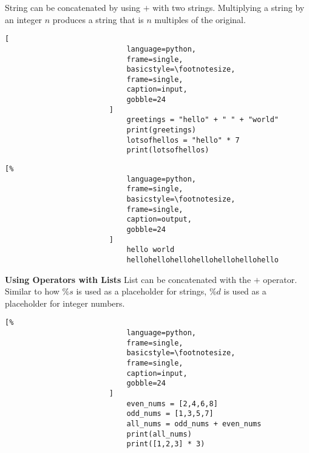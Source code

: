 \documentclass[crop=false,class=book,oneside]{standalone}
\begin{document}
                    String can be concatenated by using $+$ with two
                    strings. Multiplying a string by an integer $n$
                    produces a string that is $n$ multiples of the
                    original.\newline
                    \begin{minipage}[t]{.48\textwidth}
                        \centering
                        \begin{lstlisting}[
                            language=python,
                            frame=single,
                            basicstyle=\footnotesize,
                            frame=single,
                            caption=input,
                            gobble=24
                        ]
                            greetings = "hello" + " " + "world"
                            print(greetings)
                            lotsofhellos = "hello" * 7
                            print(lotsofhellos)
                        \end{lstlisting}
                    \end{minipage}\hfill
                    \begin{minipage}[t]{.48\textwidth}
                        \centering
                        \begin{lstlisting}[%
                            language=python,
                            frame=single,
                            basicstyle=\footnotesize,
                            frame=single,
                            caption=output,
                            gobble=24
                        ]
                            hello world
                            hellohellohellohellohellohellohello
                        \end{lstlisting}
                    \end{minipage}
                \textbf{Using Operators with Lists}
                    List can be concatenated with the $+$ operator.
                    Similar to how $\%s$ is used as a placeholder for
                    strings, $\%d$ is used as a placeholder for integer
                    numbers.\newline
                    \begin{minipage}[t]{.48\textwidth}
                        \centering
                        \begin{lstlisting}[%
                            language=python,
                            frame=single,
                            basicstyle=\footnotesize,
                            frame=single,
                            caption=input,
                            gobble=24
                        ]
                            even_nums = [2,4,6,8]
                            odd_nums = [1,3,5,7]
                            all_nums = odd_nums + even_nums
                            print(all_nums)
                            print([1,2,3] * 3)
                        \end{lstlisting}
                    \end{minipage}\hfill
\end{document}
